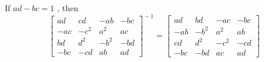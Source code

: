 \documentclass[11pt]{amsbook}
\begin{document}

\begin{exercise}
If $ad - bc = 1$ , then
\[\begin{bmatrix}
ad & cd & -ab & -bc \\
-ac & -c^{2} & a^2 & ac \\
bd & d^2 & -b^2 & -bd \\
-bc & -cd & ab & ad
\end{bmatrix}^{\!-1} = \begin{bmatrix}
ad & bd & -ac & -bc \\
-ab & -b^2 & a^2 & ab \\
cd & d^2 & -c^2 & -cd \\ 
-bc & -bd & ac & ad
\end{bmatrix}\]
\end{exercise}
















\end{document}
